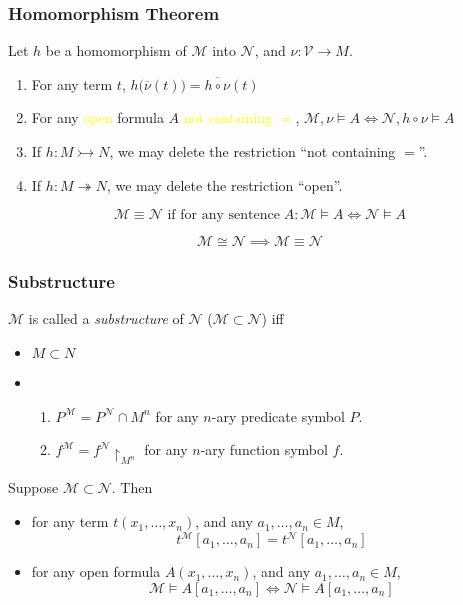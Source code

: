 \documentclass[UTF8,aspectratio=43,11pt,colorlinks,compress,openany]{beamer}%
\begin{document}
\begin{frame}\frametitle{Homomorphism Theorem}
	\begin{theorem}
		Let $h$ be a homomorphism of $\mathcal{M}$ into $\mathcal{N}$, and $\nu: \mathcal{V}\to M$.
		\begin{enumerate}
			\item For any term $t$, $h\bigl(\overline{\nu}(t)\bigr)=\overline{h\circ\nu}(t)$
			\item For any \textcolor{yellow}{open} formula $A$ \textcolor{yellow}{not containing $=$}, $\mathcal{M},\nu\vDash A\iff\mathcal{N},h\circ\nu\vDash A$
			\item If $h: M\rightarrowtail N$, we may delete the restriction ``not containing $=$''.
			\item If $h: M\twoheadrightarrow N$, we may delete the restriction ``open''.
		\end{enumerate}
	\end{theorem}
	\begin{definition}
		\[\mathcal{M}\equiv\mathcal{N} \text{ if for any sentence}\; A: \mathcal{M}\vDash A\iff\mathcal{N}\vDash A\]
	\end{definition}
	\[\mathcal{M}\cong\mathcal{N}\implies\mathcal{M}\equiv\mathcal{N}\]
\end{frame}

\begin{frame}\frametitle{Substructure}
	\begin{definition}[Substructure]
		$\mathcal{M}$ is called a \emph{substructure} of $\mathcal{N}$ ($\mathcal{M}\subset\mathcal{N}$) iff
		\begin{itemize}
			\item $M\subset N$
			\item
			\begin{enumerate}
				\item $P^{\mathcal{M}}=P^{\mathcal{N}}\cap M^n$ for any $n$-ary predicate symbol $P$.
				\item $f^{\mathcal{M}}=f^{\mathcal{N}}{\restriction_{M^n}}$ for any $n$-ary function symbol $f$.
			\end{enumerate}
		\end{itemize}
	\end{definition}
	\begin{block}{}
	Suppose $\mathcal{M}\subset\mathcal{N}$. Then
		\begin{itemize}
			\item for any term $t(x_1,\dots,x_n)$, and any $a_1,\dots,a_n\in M$,
			\[t^{\mathcal{M}}[a_1,\dots,a_n]=t^{\mathcal{N}}[a_1,\dots,a_n]\]
			\item for any open formula $A(x_1,\dots,x_n)$, and any $a_1,\dots,a_n\in M$,
			\[\mathcal{M}\vDash A[a_1,\dots,a_n]\iff\mathcal{N}\vDash A[a_1,\dots,a_n]\]
		\end{itemize} 
	\end{block}
\end{frame}
\end{document}
